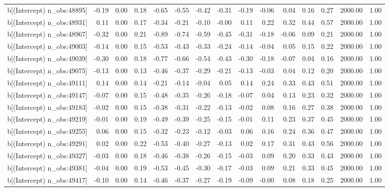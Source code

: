 \begin{table}[ht]
\begin{tabular}{rrrrrrrrrrrrrrr}
  b[(Intercept) n\_obs:48895] & -0.19 & 0.00 & 0.18 & -0.65 & -0.55 & -0.42 & -0.31 & -0.19 & -0.06 & 0.04 & 0.16 & 0.27 & 2000.00 & 1.00 \\ 
  b[(Intercept) n\_obs:48931] & 0.11 & 0.00 & 0.17 & -0.34 & -0.21 & -0.10 & -0.00 & 0.11 & 0.22 & 0.32 & 0.44 & 0.57 & 2000.00 & 1.00 \\ 
  b[(Intercept) n\_obs:48967] & -0.32 & 0.00 & 0.21 & -0.89 & -0.74 & -0.59 & -0.45 & -0.31 & -0.18 & -0.06 & 0.09 & 0.21 & 2000.00 & 1.00 \\ 
  b[(Intercept) n\_obs:49003] & -0.14 & 0.00 & 0.15 & -0.53 & -0.43 & -0.33 & -0.24 & -0.14 & -0.04 & 0.05 & 0.15 & 0.22 & 2000.00 & 1.00 \\ 
  b[(Intercept) n\_obs:49039] & -0.30 & 0.00 & 0.18 & -0.77 & -0.66 & -0.54 & -0.43 & -0.30 & -0.18 & -0.07 & 0.04 & 0.16 & 2000.00 & 1.00 \\ 
  b[(Intercept) n\_obs:49075] & -0.13 & 0.00 & 0.13 & -0.46 & -0.37 & -0.29 & -0.21 & -0.13 & -0.03 & 0.04 & 0.12 & 0.20 & 2000.00 & 1.00 \\ 
  b[(Intercept) n\_obs:49111] & 0.14 & 0.00 & 0.14 & -0.21 & -0.14 & -0.04 & 0.05 & 0.14 & 0.24 & 0.33 & 0.43 & 0.51 & 2000.00 & 1.00 \\ 
  b[(Intercept) n\_obs:49147] & -0.07 & 0.00 & 0.15 & -0.48 & -0.35 & -0.26 & -0.18 & -0.07 & 0.04 & 0.13 & 0.23 & 0.32 & 2000.00 & 1.00 \\ 
  b[(Intercept) n\_obs:49183] & -0.02 & 0.00 & 0.15 & -0.38 & -0.31 & -0.22 & -0.13 & -0.02 & 0.08 & 0.16 & 0.27 & 0.38 & 2000.00 & 1.00 \\ 
  b[(Intercept) n\_obs:49219] & -0.01 & 0.00 & 0.19 & -0.49 & -0.39 & -0.25 & -0.15 & -0.01 & 0.11 & 0.23 & 0.37 & 0.45 & 2000.00 & 1.00 \\ 
  b[(Intercept) n\_obs:49255] & 0.06 & 0.00 & 0.15 & -0.32 & -0.23 & -0.12 & -0.03 & 0.06 & 0.16 & 0.24 & 0.36 & 0.47 & 2000.00 & 1.00 \\ 
  b[(Intercept) n\_obs:49291] & 0.02 & 0.00 & 0.22 & -0.53 & -0.40 & -0.27 & -0.13 & 0.02 & 0.17 & 0.31 & 0.43 & 0.56 & 2000.00 & 1.00 \\ 
  b[(Intercept) n\_obs:49327] & -0.03 & 0.00 & 0.18 & -0.46 & -0.38 & -0.26 & -0.15 & -0.03 & 0.09 & 0.20 & 0.33 & 0.43 & 2000.00 & 1.00 \\ 
  b[(Intercept) n\_obs:49381] & -0.04 & 0.00 & 0.19 & -0.53 & -0.45 & -0.30 & -0.17 & -0.03 & 0.09 & 0.21 & 0.33 & 0.45 & 2000.00 & 1.00 \\ 
  b[(Intercept) n\_obs:49417] & -0.10 & 0.00 & 0.14 & -0.46 & -0.37 & -0.27 & -0.19 & -0.09 & -0.00 & 0.08 & 0.18 & 0.25 & 2000.00 & 1.00 \\ 

\end{tabular}
\end{table}
